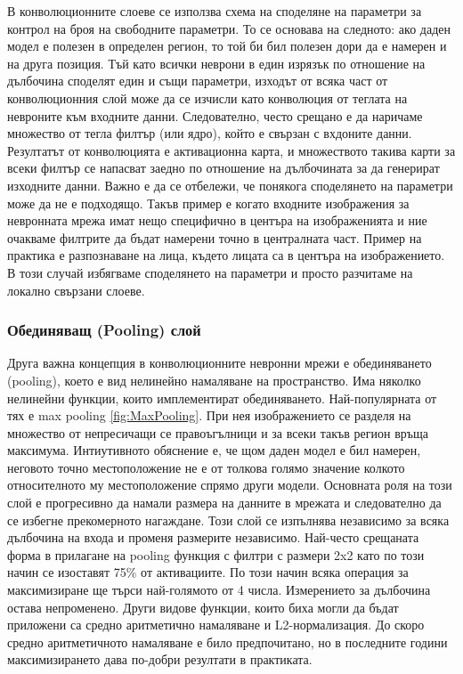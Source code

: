 В конволюционните слоеве се използва схема на споделяне на параметри  за контрол на броя на свободните параметри. То се основава на следното: ако даден модел е полезен в определен регион, то той би бил полезен дори да е намерен и на друга позиция. Тъй като всички неврони в един изрязък по отношение на дълбочина споделят един и същи параметри, изходът от всяка част от конволюционния слой може да се изчисли като конволюция от теглата на невроните към входните данни. Следователно, често срещано е да наричаме множество от тегла филтър (или ядро), който е свързан с вхдоните данни. Резултатът от конволюцията е активационна карта, и множеството такива карти за всеки филтър се напасват заедно по отношение на дълбочината за да генерират изходните данни. 
Важно е да се отбележи, че понякога споделянето на параметри може да не е подходящо. Такъв пример е когато входните изображения за невронната мрежа имат нещо специфично в центъра на изображенията и ние очакваме филтрите да бъдат намерени точно в централната част. Пример на практика е разпознаване на лица, където лицата са в центъра на изображението. В този случай избягваме споделянето на параметри и просто разчитаме на локално свързани слоеве.

\subsubsection{Обединяващ (Pooling) слой}
Друга важна концепция в конволюционните невронни мрежи е обединяването (pooling), което е вид нелинейно намаляване на пространство. Има няколко нелинейни функции, които имплементират обединяването. Най-популярната от тях е max pooling \ref{fig:MaxPooling}. При нея изображението се разделя на множество от непресичащи се правоъгълници и за всеки такъв регион връща максимума. Интиутивното обяснение е, че щом даден модел е бил намерен, неговото точно местоположение не е от толкова голямо значение колкото относителното му местоположение спрямо други модели. Основната роля на този слой е прогресивно да намали размера на данните в мрежата и следователно да се избегне прекомерното нагаждане. 
Този слой се изпълнява независимо за всяка дълбочина на входа и променя размерите независимо. Най-често срещаната форма в прилагане на pooling функция с филтри с размери 2x2 като по този начин се изоставят 75\% от активациите. По този начин всяка операция за максимизиране ще търси най-голямото от 4 числа. Измерението за дълбочина остава непроменено.
Други видове функции, които биха могли да бъдат приложени са средно аритметично намаляване и L2-нормализация. До скоро средно аритметичното намаляване е било предпочитано, но в последните години максимизирането дава по-добри резултати в практиката.

